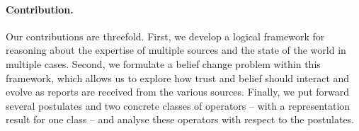 

\paragraph{Contribution.} Our contributions are threefold. First, we develop a
logical framework for reasoning about the expertise of multiple sources and the
state of the world in multiple cases. Second, we formulate a belief change
problem within this framework, which allows us to explore how trust and belief
should interact and evolve as reports are received from the various sources.
Finally, we put forward several postulates and two concrete classes of
operators -- with a representation result for one class -- and analyse these
operators with respect to the postulates.

